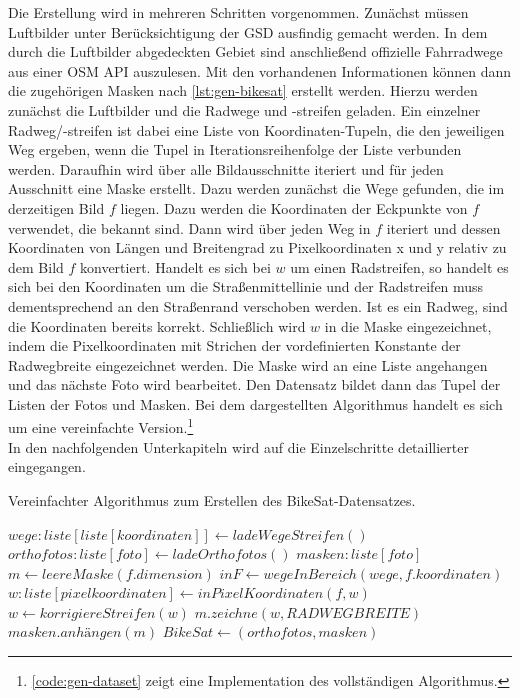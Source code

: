 Die Erstellung wird in mehreren Schritten vorgenommen.
Zunächst müssen Luftbilder unter Berücksichtigung der \ac{GSD} ausfindig gemacht werden.
In dem durch die Luftbilder abgedeckten Gebiet sind anschließend offizielle Fahrradwege aus einer \ac{OSM} API auszulesen.
Mit den vorhandenen Informationen können dann die zugehörigen Masken nach \autoref{lst:gen-bikesat} erstellt werden.
Hierzu werden zunächst die Luftbilder und die Radwege und -streifen geladen. Ein einzelner Radweg/-streifen 
ist dabei eine Liste von Koordinaten-Tupeln, die den jeweiligen Weg ergeben, 
wenn die Tupel in Iterationsreihenfolge der Liste verbunden werden.
Daraufhin wird über alle Bildausschnitte iteriert und für jeden Ausschnitt eine Maske erstellt. 
Dazu werden zunächst die Wege gefunden, die im derzeitigen Bild $f$ liegen. Dazu werden die Koordinaten der 
Eckpunkte von $f$ verwendet, die bekannt sind. Dann wird über jeden Weg in $f$ iteriert und dessen 
Koordinaten von Längen und Breitengrad zu Pixelkoordinaten x und y relativ zu dem Bild $f$ konvertiert. 
Handelt es sich bei $w$ um einen Radstreifen, so handelt es sich bei den Koordinaten um die Straßenmittellinie 
und der Radstreifen muss dementsprechend an den Straßenrand verschoben werden. Ist es ein Radweg,
sind die Koordinaten bereits korrekt. Schließlich wird $w$ in die Maske eingezeichnet, 
indem die Pixelkoordinaten mit Strichen der vordefinierten Konstante der Radwegbreite eingezeichnet werden.
Die Maske wird an eine Liste angehangen und das nächste Foto wird bearbeitet. Den Datensatz bildet 
dann das Tupel der Listen der Fotos und Masken. Bei dem dargestellten Algorithmus handelt es sich um eine 
vereinfachte Version.\footnote{\autoref{code:gen-dataset} zeigt eine Implementation des vollständigen Algorithmus.} \\   
In den nachfolgenden Unterkapiteln wird auf die Einzelschritte detaillierter eingegangen.

\begin{algorithm}
	\caption{Vereinfachter Algorithmus zum Erstellen des BikeSat-Datensatzes.}\label{lst:gen-bikesat}
	\begin{algorithmic}[1]
		\State $wege: liste[liste[koordinaten]] \gets ladeWegeStreifen()$ 
		\State $orthofotos: liste[foto]\gets ladeOrthofotos()$ 
		\State $masken: liste[foto]$
			\State $m \gets leereMaske(f.dimension)$
			\State $inF \gets wegeInBereich(wege, f.koordinaten)$
				\State $w: liste[pixelkoordinaten] \gets inPixelKoordinaten(f, w)$
				 
					\State $w \gets korrigiereStreifen(w)$
				\EndIf
				\State $m.zeichne(w, RADWEGBREITE)$
			\EndFor
			\State $masken.anhängen(m)$
		\EndFor
		\State $BikeSat \gets (orthofotos, masken)$
	\end{algorithmic}
\end{algorithm}

